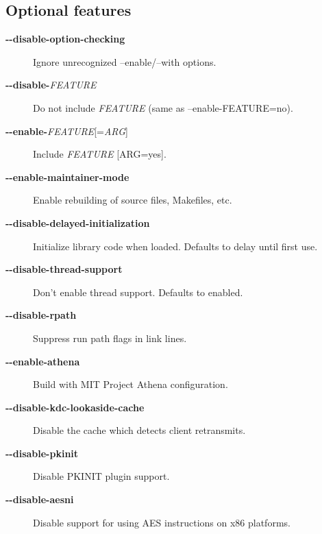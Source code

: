 \documentclass[letterpaper,10pt,english]{sphinxmanual}
\begin{document}
\subsection{Optional features}
\label{build/options2configure:optional-features}\begin{description}
\item[{\textbf{-}\textbf{-disable-option-checking}}] \leavevmode
Ignore unrecognized --enable/--with options.

\item[{\textbf{-}\textbf{-disable-}\emph{FEATURE}}] \leavevmode
Do not include \emph{FEATURE} (same as --enable-FEATURE=no).

\item[{\textbf{-}\textbf{-enable-}\emph{FEATURE}{[}=\emph{ARG}{]}}] \leavevmode
Include \emph{FEATURE} {[}ARG=yes{]}.

\item[{\textbf{-}\textbf{-enable-maintainer-mode}}] \leavevmode
Enable rebuilding of source files, Makefiles, etc.

\item[{\textbf{-}\textbf{-disable-delayed-initialization}}] \leavevmode
Initialize library code when loaded.  Defaults to delay until
first use.

\item[{\textbf{-}\textbf{-disable-thread-support}}] \leavevmode
Don't enable thread support.  Defaults to enabled.

\item[{\textbf{-}\textbf{-disable-rpath}}] \leavevmode
Suppress run path flags in link lines.

\item[{\textbf{-}\textbf{-enable-athena}}] \leavevmode
Build with MIT Project Athena configuration.

\item[{\textbf{-}\textbf{-disable-kdc-lookaside-cache}}] \leavevmode
Disable the cache which detects client retransmits.

\item[{\textbf{-}\textbf{-disable-pkinit}}] \leavevmode
Disable PKINIT plugin support.

\item[{\textbf{-}\textbf{-disable-aesni}}] \leavevmode
Disable support for using AES instructions on x86 platforms.

\end{description}
\end{document}
